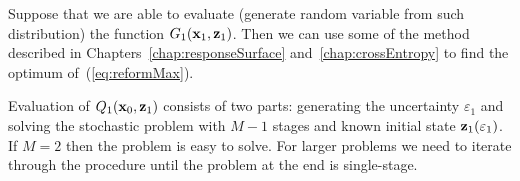 Suppose that we are able to evaluate (generate random variable from such distribution) the function $G_1 (\mathbf{x}_{1}, \operatorname{\mathbf{z}}_{1})$. Then we can use some of the method described in Chapters~\ref{chap:responseSurface} and~\ref{chap:crossEntropy} to find the optimum of~(\ref{eq:reformMax}).

Evaluation of $Q_1 (\mathbf{x}_{0}, \operatorname{\mathbf{z}}_{1})$ consists of two parts: generating the uncertainty $\varepsilon_1$ and solving the stochastic problem with $M-1$ stages and known initial state $\operatorname{\mathbf{z}}_1 (\varepsilon_1)$. If $M=2$ then the problem is easy to solve. For larger problems we need to iterate through the procedure until the problem at the end is single-stage.



